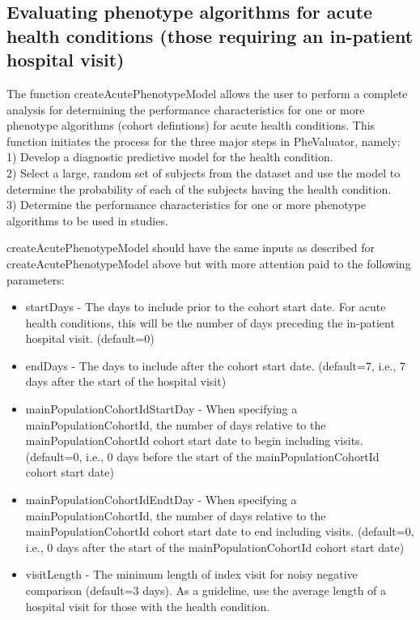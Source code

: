 \documentclass[
]{article}
\providecommand{\tightlist}{%
  \setlength{\itemsep}{0pt}\setlength{\parskip}{0pt}}
\begin{document}
\hypertarget{evaluating-phenotype-algorithms-for-acute-health-conditions-those-requiring-an-in-patient-hospital-visit}{%
\subsection{Evaluating phenotype algorithms for acute health conditions
(those requiring an in-patient hospital
visit)}\label{evaluating-phenotype-algorithms-for-acute-health-conditions-those-requiring-an-in-patient-hospital-visit}}

The function createAcutePhenotypeModel allows the user to perform a
complete analysis for determining the performance characteristics for
one or more phenotype algorithms (cohort defintions) for acute health
conditions. This function initiates the process for the three major
steps in PheValuator, namely:\\
1) Develop a diagnostic predictive model for the health condition.\\
2) Select a large, random set of subjects from the dataset and use the
model to determine the probability of each of the subjects having the
health condition.\\
3) Determine the performance characteristics for one or more phenotype
algorithms to be used in studies.

createAcutePhenotypeModel should have the same inputs as described for
createAcutePhenotypeModel above but with more attention paid to the
following parameters:

\begin{itemize}
\tightlist
\item
  startDays - The days to include prior to the cohort start date. For
  acute health conditions, this will be the number of days preceding the
  in-patient hospital visit. (default=0)
\item
  endDays - The days to include after the cohort start date. (default=7,
  i.e., 7 days after the start of the hospital visit)
\item
  mainPopulationCohortIdStartDay - When specifying a
  mainPopulationCohortId, the number of days relative to the
  mainPopulationCohortId cohort start date to begin including visits.
  (default=0, i.e., 0 days before the start of the
  mainPopulationCohortId cohort start date)
\item
  mainPopulationCohortIdEndtDay - When specifying a
  mainPopulationCohortId, the number of days relative to the
  mainPopulationCohortId cohort start date to end including visits.
  (default=0, i.e., 0 days after the start of the mainPopulationCohortId
  cohort start date)
\item
  visitLength - The minimum length of index visit for noisy negative
  comparison (default=3 days). As a guideline, use the average length of
  a hospital visit for those with the health condition.
\end{itemize}
\end{document}
